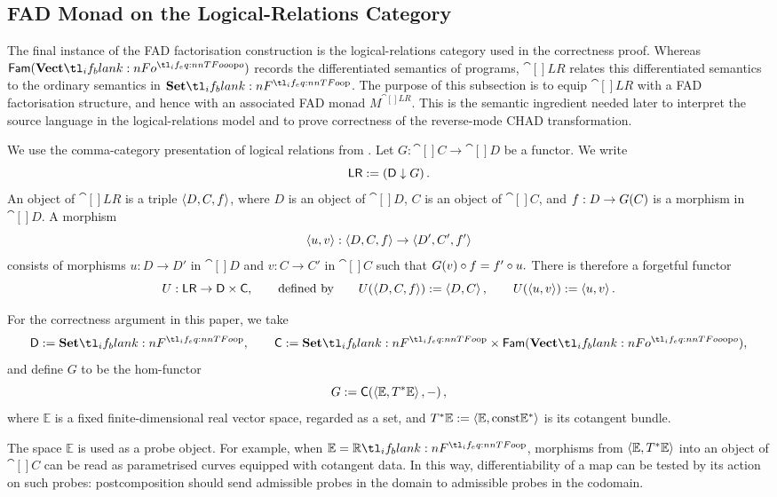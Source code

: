 \documentclass[11pt,a4paper]{article}
\theoremstyle{definition}
\theoremstyle{remark}
\providecommand{\const}{\mathrm{const}}
\providecommand{\Fam}[1]{\mathsf{Fam}(#1)}
\providecommand{\TE}{T^{\ast}\E}
\providecommand{\E}{\mathbb{E}}
\providecommand{\blankdash}{\mathord{-}}
\begin{document}
\subsection{FAD Monad on the Logical-Relations Category}
\label{sec:fad-monad-on-the-logical-relations-category}

The final instance of the FAD factorisation construction is the
logical-relations category used in the correctness proof. Whereas
\( \Fam{\Vect[o]} \) records the differentiated semantics of programs,
\( \cat[]{LR} \) relates this differentiated semantics to the ordinary
semantics in \( \Set \). The purpose of this subsection is to equip
\( \cat[]{LR} \) with a FAD factorisation structure, and hence with an
associated FAD monad \(M^{\cat[]{LR}}\). This is the semantic ingredient needed
later to interpret the source language in the logical-relations model and to
prove correctness of the reverse-mode CHAD transformation.

We use the comma-category presentation of logical relations from
\cite[Section~11]{lucatellinunesCHADExpressiveTotal2023}. Let
\( G:\cat[]{C}\to\cat[]{D} \) be a functor. We write
\[
\cat[]{LR}:=\commacat{\cat[]{D}}{G}.
\]
An object of \( \cat[]{LR} \) is a triple \( \left\langle D,C,f\right\rangle \), where
\(D\) is an object of \( \cat[]{D} \), \(C\) is an object of \( \cat[]{C} \),
and \(f:D\to\Fun[nn]{G}{C}\) is a morphism in \( \cat[]{D} \). A morphism
\[
\left\langle u,v\right\rangle:\left\langle D,C,f\right\rangle\to\left\langle D',C',f'\right\rangle
\]
consists of morphisms \(u:D\to D'\) in \( \cat[]{D} \) and
\(v:C\to C'\) in \( \cat[]{C} \) such that
\(
\Fun[nn]{G}{v}\circ f = f'\circ u.
\)
There is therefore a forgetful functor
\[
U:\cat[]{LR}\to\cat[]{D}\times\cat[]{C},
\qquad
\textnormal{defined by}
\qquad
\Fun[nn]{U}{\tuple{D,C,f}}:=\tuple{D,C},
\qquad
\Fun[nn]{U}{\tuple{u,v}}:=\tuple{u,v}.
\]

For the correctness argument in this paper, we take
\[
\cat[]{D}:=\Set,
\qquad
\cat[]{C}:=\Set\times\Fam{\Vect[o]},
\]
and define \(G\) to be the hom-functor
\begin{equation}
	\label{eq:definition-g-functor-logical-relations}
	G := \fn[n]{ \cat[]{C} }{ \tuple{ \E, \TE }, \blankdash },
\end{equation}
where \( \E \) is a fixed finite-dimensional real vector space, regarded as a
set, and
\(
\TE:=\tuple{\E,\const\E^{\ast}}
\)
is its cotangent bundle.

The space \( \E \) is used as a probe object. For example, when
\( \E=\R \), morphisms from \( \tuple{\E,\TE} \) into an object of
\( \cat[]{C} \) can be read as parametrised curves equipped with cotangent
data. In this way, differentiability of a map can be tested by its action on
such probes: postcomposition should send admissible probes in the domain to
admissible probes in the codomain.
\end{document}
